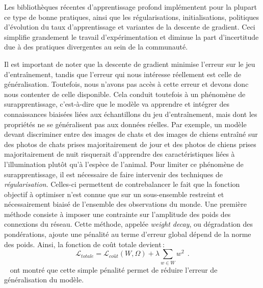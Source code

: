 Les bibliothèques récentes d'apprentissage profond implémentent pour la plupart ce type de bonne pratiques, ainsi que les régularisations, initialisations, politiques d'évolution du taux d'apprentissage et variantes de la descente de gradient. Ceci simplifie grandement le travail d'expérimentation et diminue la part d'incertitude due à des pratiques divergentes au sein de la communauté.

Il est important de noter que la descente de gradient minimise l'erreur sur le jeu d'entraînement, tandis que l'erreur qui nous intéresse réellement est celle de généralisation. Toutefois, nous n'avons pas accès à cette erreur et devons donc nous contenter de celle disponible. Cela conduit toutefois à un phénomène de surapprentissage, c'est-à-dire que le modèle va apprendre et intégrer des connaissances biaisées liées aux échantillons du jeu d'entraînement, mais dont les propriétés ne se généralisent pas aux données réelles. Par exemple, un modèle devant discriminer entre des images de chats et des images de chiens entraîné sur des photos de chats prises majoritairement de jour et des photos de chiens prises majoritairement de nuit risquerait d'apprendre des caractéristiques liées à l'illumination plutôt qu'à l'espèce de l'animal.
Pour limiter ce phénomène de surapprentissage, il est nécessaire de faire intervenir des techniques de \emph{régularisation}. Celles-ci permettent de contrebalancer le fait que la fonction objectif à optimiser n'est connue que sur un sous-ensemble restreint et nécessairement biaisé de l'ensemble des observations du monde. Une première méthode consiste à imposer une contrainte sur l'amplitude des poids des connexions du réseau. Cette méthode, appelée \emph{weight decay}, ou dégradation des pondérations, ajoute une pénalité au terme d'erreur global dépend de la norme des poids. Ainsi, la fonction de coût totale devient\,:
$$\mathcal{L}_{totale} = \mathcal{L}_{co\hat{u}t}(W, \Omega) + \lambda \sum_{w \in W} w^2~~.$$
~\citet{krogh_simple_1991} ont montré que cette simple pénalité permet de réduire l'erreur de généralisation du modèle.

